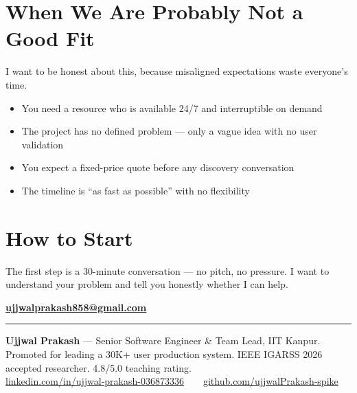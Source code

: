 \documentclass[11pt,a4paper]{article}
\begin{document}
\section{When We Are Probably Not a Good Fit}

I want to be honest about this, because misaligned expectations waste everyone's time.

\begin{itemize}
  \item You need a resource who is available 24/7 and interruptible on demand
  \item The project has no defined problem — only a vague idea with no user validation
  \item You expect a fixed-price quote before any discovery conversation
  \item The timeline is ``as fast as possible'' with no flexibility
\end{itemize}

\section{How to Start}

The first step is a 30-minute conversation — no pitch, no pressure. I want to understand your problem and tell you honestly whether I can help.

\begin{center}
  \vspace{0.5em}
  \large\bfseries
  \href{mailto:ujjwalprakash858@gmail.com}{ujjwalprakash858@gmail.com}
  \vspace{0.3em}
\end{center}

\vspace{0.5em}
\color{rule}\rule{\linewidth}{0.4pt}\color{dark}
\vspace{0.5em}

{\small\color{mid}
\textbf{Ujjwal Prakash} — Senior Software Engineer \& Team Lead, IIT Kanpur.
Promoted for leading a 30K+ user production system. IEEE IGARSS 2026 accepted researcher. 4.8/5.0 teaching rating.\\[4pt]
\href{https://www.linkedin.com/in/ujjwal-prakash-036873336/}{linkedin.com/in/ujjwal-prakash-036873336}\ \ \textbullet\ \ 
\href{https://github.com/ujjwalPrakash-spike}{github.com/ujjwalPrakash-spike}
}
\end{document}
